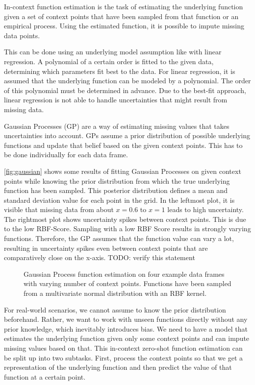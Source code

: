 In-context function estimation is the task of estimating the underlying function given a set of context points that have been sampled from that function or an empirical process. Using the estimated function, it is possible to impute missing data points. \cite{seifner2025zeroshotimputationfoundationinference}

This can be done using an underlying model assumption like with linear regression. A polynomial of a certain order is fitted to the given data, determining which parameters fit best to the data. For linear regression, it is assumed that the underlying function can be modeled by a polynomial. The order of this polynomial must be determined in advance. Due to the best-fit approach, linear regression is not able to handle uncertainties that might result from missing data.

Gaussian Processes (GP) are a way of estimating missing values that takes uncertainties into account. GPs assume a prior distribution of possible underlying functions and update that belief based on the given context points. This has to be done individually for each data frame. \cite{garnelo2018neural}

\autoref{fig:gaussian} shows some results of fitting Gaussian Processes on given context points while knowing the prior distribution from which the true underlying function has been sampled. This posterior distribution defines a mean and standard deviation value for each point in the grid. In the leftmost plot, it is visible that missing data from about $x=0.6$ to $x=1$ leads to high uncertainty. The rightmost plot shows uncertainty spikes between context points. This is due to the low RBF-Score. Sampling with a low RBF Score results in strongly varying functions. Therefore, the GP assumes that the function value can vary a lot, resulting in uncertainty spikes even between context points that are comparatively close on the x-axis. TODO: verify this statement 

\begin{figure*}
	\centering
	\resizebox{0.90\textwidth}{!}{
		
		
		
	}
	\caption{Gaussian Process function estimation on four example data frames with varying number of context points. Functions have been sampled from a multivariate normal distribution with an RBF kernel.}
	\label{fig:gaussian}
\end{figure*}

For real-world scenarios, we cannot assume to know the prior distribution beforehand. Rather, we want to work with unseen functions directly without any prior knowledge, which inevitably introduces bias. We need to have a model that estimates the underlying function given only some context points and can impute missing values based on that. This in-context zero-shot function estimation can be split up into two subtasks. First, process the context points so that we get a representation of the underlying function and then predict the value of that function at a certain point.

